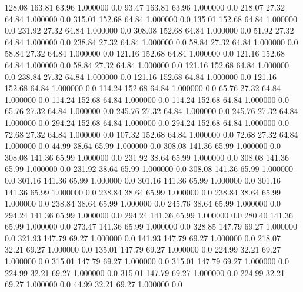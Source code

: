   128.08  163.81   63.96    1.000000    0.0
   93.47  163.81   63.96    1.000000    0.0
  218.07   27.32   64.84    1.000000    0.0
  315.01  152.68   64.84    1.000000    0.0
  135.01  152.68   64.84    1.000000    0.0
  231.92   27.32   64.84    1.000000    0.0
  308.08  152.68   64.84    1.000000    0.0
   51.92   27.32   64.84    1.000000    0.0
  238.84   27.32   64.84    1.000000    0.0
   58.84   27.32   64.84    1.000000    0.0
   58.84   27.32   64.84    1.000000    0.0
  121.16  152.68   64.84    1.000000    0.0
  121.16  152.68   64.84    1.000000    0.0
   58.84   27.32   64.84    1.000000    0.0
  121.16  152.68   64.84    1.000000    0.0
  238.84   27.32   64.84    1.000000    0.0
  121.16  152.68   64.84    1.000000    0.0
  121.16  152.68   64.84    1.000000    0.0
  114.24  152.68   64.84    1.000000    0.0
   65.76   27.32   64.84    1.000000    0.0
  114.24  152.68   64.84    1.000000    0.0
  114.24  152.68   64.84    1.000000    0.0
   65.76   27.32   64.84    1.000000    0.0
  245.76   27.32   64.84    1.000000    0.0
  245.76   27.32   64.84    1.000000    0.0
  294.24  152.68   64.84    1.000000    0.0
  294.24  152.68   64.84    1.000000    0.0
   72.68   27.32   64.84    1.000000    0.0
  107.32  152.68   64.84    1.000000    0.0
   72.68   27.32   64.84    1.000000    0.0
   44.99   38.64   65.99    1.000000    0.0
  308.08  141.36   65.99    1.000000    0.0
  308.08  141.36   65.99    1.000000    0.0
  231.92   38.64   65.99    1.000000    0.0
  308.08  141.36   65.99    1.000000    0.0
  231.92   38.64   65.99    1.000000    0.0
  308.08  141.36   65.99    1.000000    0.0
  301.16  141.36   65.99    1.000000    0.0
  301.16  141.36   65.99    1.000000    0.0
  301.16  141.36   65.99    1.000000    0.0
  238.84   38.64   65.99    1.000000    0.0
  238.84   38.64   65.99    1.000000    0.0
  238.84   38.64   65.99    1.000000    0.0
  245.76   38.64   65.99    1.000000    0.0
  294.24  141.36   65.99    1.000000    0.0
  294.24  141.36   65.99    1.000000    0.0
  280.40  141.36   65.99    1.000000    0.0
  273.47  141.36   65.99    1.000000    0.0
  328.85  147.79   69.27    1.000000    0.0
  321.93  147.79   69.27    1.000000    0.0
  141.93  147.79   69.27    1.000000    0.0
  218.07   32.21   69.27    1.000000    0.0
  135.01  147.79   69.27    1.000000    0.0
  224.99   32.21   69.27    1.000000    0.0
  315.01  147.79   69.27    1.000000    0.0
  315.01  147.79   69.27    1.000000    0.0
  224.99   32.21   69.27    1.000000    0.0
  315.01  147.79   69.27    1.000000    0.0
  224.99   32.21   69.27    1.000000    0.0
   44.99   32.21   69.27    1.000000    0.0

